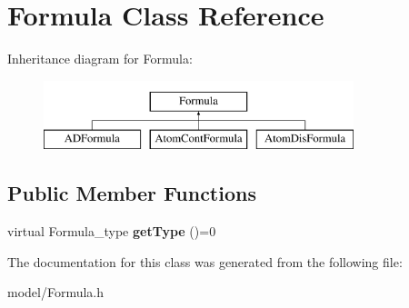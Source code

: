 \hypertarget{classFormula}{\section{Formula Class Reference}
\label{classFormula}
}
Inheritance diagram for Formula\-:\begin{figure}[H]
\begin{center}
\leavevmode
\includegraphics[height=2.000000cm]{classFormula}
\end{center}
\end{figure}
\subsection*{Public Member Functions}
\begin{DoxyCompactItemize}
\item 
\hypertarget{classFormula_aa6efa2d7eee6fc633ee30991bf11a0e0}{virtual Formula\-\_\-type {\bfseries get\-Type} ()=0}\label{classFormula_aa6efa2d7eee6fc633ee30991bf11a0e0}

\end{DoxyCompactItemize}


The documentation for this class was generated from the following file\-:\begin{DoxyCompactItemize}
\item 
model/Formula.\-h\end{DoxyCompactItemize}
